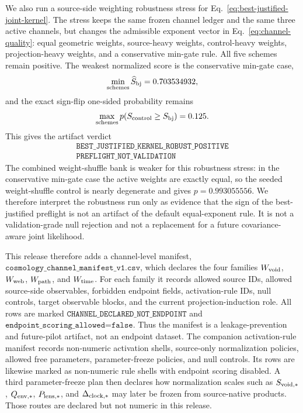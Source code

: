 \documentclass[11pt]{article}
\begin{document}
We also run a source-side weighting robustness stress for
Eq.~\eqref{eq:best-justified-joint-kernel}.  The stress keeps the same frozen
channel ledger and the same three active channels, but changes the admissible
exponent vector in Eq.~\eqref{eq:channel-quality}: equal geometric weights,
source-heavy weights, control-heavy weights, projection-heavy weights, and a
conservative min-gate rule.  All five schemes remain positive.  The weakest
normalized score is the conservative min-gate case,
\[
\min_{\rm schemes}\widehat S_{\rm bj}=0.703534932,
\]
and the exact sign-flip one-sided probability remains
\[
\max_{\rm schemes}p(S_{\rm control}\ge S_{\rm bj})=0.125.
\]
This gives the artifact verdict
\[
\begin{gathered}
\texttt{BEST\_JUSTIFIED\_KERNEL\_ROBUST\_POSITIVE}\\
\texttt{PREFLIGHT\_NOT\_VALIDATION}
\end{gathered}
\]
The combined weight-shuffle bank is weaker for this robustness stress: in the
conservative min-gate case the active weights are exactly equal, so the seeded
weight-shuffle control is nearly degenerate and gives
\(p=0.993055556\).  We therefore interpret the robustness run only as evidence
that the sign of the best-justified preflight is not an artifact of the
default equal-exponent rule.  It is not a validation-grade null rejection and
not a replacement for a future covariance-aware joint likelihood.

This release therefore adds a channel-level manifest,
\(\texttt{cosmology\_channel\_manifest\_v1.csv}\), which declares the four
families \(W_{\rm void}\), \(W_{\rm web}\), \(W_{\rm path}\), and
\(W_{\rm time}\). For each family it records allowed source IDs, allowed
source-side observables, forbidden endpoint fields, activation-rule IDs,
null controls, target observable blocks, and the current projection-induction
role. All rows are marked
\(\texttt{CHANNEL\_DECLARED\_NOT\_ENDPOINT}\) and
\(\texttt{endpoint\_scoring\_allowed=false}\). Thus the manifest is a
leakage-prevention and future-pilot artifact, not an endpoint dataset.
The companion activation-rule manifest records non-numeric activation shells,
source-only normalization policies, allowed free parameters,
parameter-freeze policies, and null controls. Its rows are likewise marked as
non-numeric rule shells with endpoint scoring disabled.
A third parameter-freeze plan then declares how normalization scales such as
\(S_{\rm void,\ast}\), \(Q_{\rm env,\ast}\), \(P_{\rm lens,\ast}\), and
\(\Delta_{\rm clock,\ast}\) may later be frozen from source-native products.
Those routes are declared but not numeric in this release.
\end{document}
